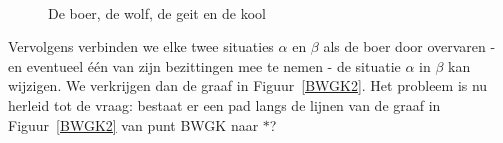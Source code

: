 \begin{figure}[ht]
\mbox{
\hspace{1cm}
\hspace{2.5cm}
}
\caption{De boer, de wolf, de geit en de kool}
\end{figure}

Vervolgens verbinden we elke twee situaties $\alpha$ en $\beta$ als de
boer door overvaren - en eventueel \'{e}\'{e}n van zijn bezittingen
mee te nemen - de situatie $\alpha$ in $\beta$ kan wijzigen. We
verkrijgen dan de graaf in Figuur~\ref{BWGK2}.  Het probleem is nu
herleid tot de vraag: bestaat er een pad langs de lijnen van de graaf
in Figuur~\ref{BWGK2} van punt BWGK naar $\ast$?

